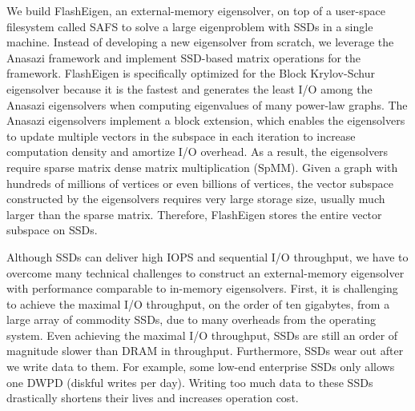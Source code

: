 
We build FlashEigen, an external-memory eigensolver, on top of a user-space
filesystem called SAFS \cite{safs} to solve a large eigenproblem with SSDs
in a single machine. 
Instead of developing a new eigensolver from scratch, we leverage
the Anasazi framework and implement SSD-based matrix operations
for the framework. FlashEigen is specifically optimized for the Block
Krylov-Schur \cite{krylovschur} eigensolver because it is the fastest and
generates the least I/O among the Anasazi eigensolvers when computing
eigenvalues of many power-law graphs. The Anasazi eigensolvers implement
a block extension, which enables the eigensolvers to update multiple vectors
in the subspace in each iteration to increase computation density and amortize
I/O overhead. As a result, the eigensolvers require sparse matrix dense matrix
multiplication (SpMM). Given a graph with hundreds of millions of vertices or
even billions of vertices,
the vector subspace constructed by the eigensolvers requires very large storage
size, usually much larger than the sparse matrix. Therefore, FlashEigen stores
the entire vector subspace on SSDs.


Although SSDs can deliver high IOPS and sequential I/O throughput, we have
to overcome many technical challenges to construct an external-memory
eigensolver with performance comparable to in-memory eigensolvers.
First, it is challenging to achieve the maximal I/O throughput, on the order
of ten gigabytes, from a large array of commodity SSDs, due to many overheads
from the operating system. Even achieving the maximal I/O throughput, SSDs are
still an order of magnitude slower than DRAM in throughput. Furthermore,
SSDs wear out after we write data to them. For example, some low-end enterprise
SSDs \cite{} only allows one DWPD (diskful writes per day). Writing too much
data to these SSDs drastically shortens their lives and increases operation
cost.

